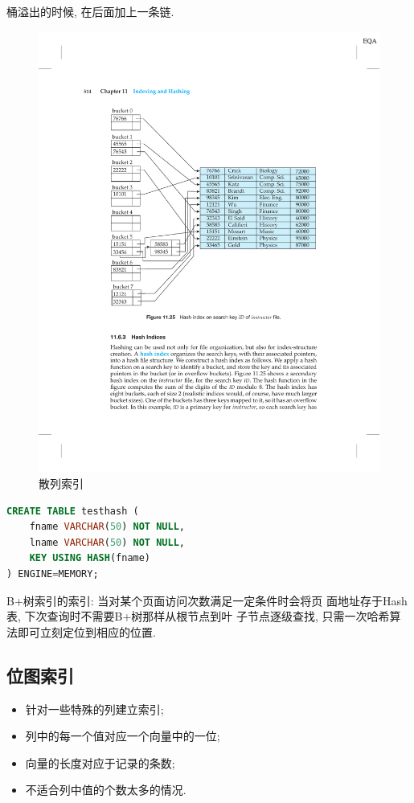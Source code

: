 桶溢出的时候, 在后面加上一条链.

\begin{figure}[H]
    \centering
    \includegraphics[width=.8\textwidth]{figure/散列索引.pdf}
    \caption{散列索引}
\end{figure}

\begin{lstlisting}[language=SQL, caption={MySQL中的散列索引}]
CREATE TABLE testhash (
    fname VARCHAR(50) NOT NULL,
    lname VARCHAR(50) NOT NULL,
    KEY USING HASH(fname)
) ENGINE=MEMORY;
\end{lstlisting}

B+树索引的索引: 当对某个页面访问次数满足一定条件时会将页
面地址存于Hash表, 下次查询时不需要B+树那样从根节点到叶
子节点逐级查找, 只需一次哈希算法即可立刻定位到相应的位置.


\subsection{位图索引}

\begin{itemize}
    \item 针对一些特殊的列建立索引;
    \item 列中的每一个值对应一个向量中的一位;
    \item 向量的长度对应于记录的条数;
    \item 不适合列中值的个数太多的情况.
\end{itemize}

